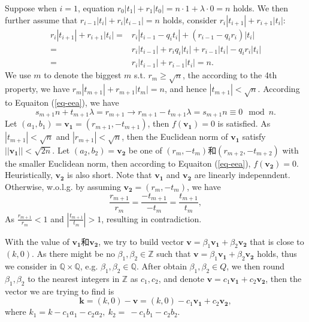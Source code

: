 \documentclass{article}
\newcommand{\Z}{\mathbb{Z}}
\newcommand{\Q}{\mathbb{Q}}
\begin{document}
Suppose when $i = 1$, equation $r_0|t_1| + r_1|t_0| = n \cdot 1 + \lambda \cdot 0 = n$ holds.
We then further assume that $r_{i-1}|t_i| + r_i|t_{i-1}| = n$ holds, consider $r_{i}|t_{i+1}| + r_{i+1}|t_{i}|$:
\begin{equation}\nonumber
\begin{split}
r_{i}|t_{i+1}| + r_{i+1}|t_{i}| = & r_{i}|t_{i-1} - q_{i}t_{i}| + (r_{i-1}-q_{i}r_{i})|t_{i}| \\
= & r_i|t_{i-1}| + r_iq_i|t_i| + r_{i-1}|t_i| - q_ir_i|t_i|\\
= & r_i|t_{i-1}|+ r_{i-1}|t_i| = n.
\end{split}
\end{equation}
We use $m$ to denote the biggest $m$ s.t. $r_m \ge \sqrt{n}$,
the according to the 4th property, we have $r_m|t_{m+1}| + r_{m+1}|t_m| = n$, and hence $|t_{m+1}|<\sqrt{n}$.
According to Equaiton (\ref{eq-eea}), we have
$$s_{m+1}n + t_{m+1}\lambda = r_{m+1} \rightarrow r_{m+1} - t_{m+1} \lambda = s_{m+1} n \equiv 0 \mod n.$$
Let $(a_1, b_1) = \mathbf{v_1}  = (r_{m+1}, - t_{m+1})$, then $f(\mathbf{v_1}) = 0$ is satisfied.
As $|t_{m+1}|<\sqrt{n}$ and $|r_{m+1}| < \sqrt{n}$,  then the Euclidean norm of $\mathbf{v_1}$ satisfy $||\mathbf{v_1}|| <\sqrt{2n}$.
Let $(a_2, b_2) = \mathbf{v_2}$ be one of $(r_{m}, - t_{m})$和$(r_{m+2}, - t_{m+2})$ with the smaller Euclidean norm,
then according to Equaiton (\ref{eq-eea}), $f(\mathbf{v_2}) = 0$.
Heuristically, $\mathbf{v_2}$ is also short.
Note that $\mathbf{v_1}$ and $\mathbf{v_2}$ are linearly indepenndent. 
Otherwise, w.o.l.g.  by assuming $\mathbf{v_2}=(r_m,-t_m)$, we have
$$
\dfrac{r_{m+1}}{r_m} = \dfrac{-t_{m+1}}{-t_m} = \dfrac{t_{m+1}}{t_m},
$$
As $\frac{r_{m+1}}{r_m} < 1$ and $|\frac{t_{m+1}}{t_m}| > 1$, resulting in contradiction.

With the value of $\mathbf{v_1}$和$\mathbf{v_2}$, we try to build vector 
$\mathbf{v} = \beta_1\mathbf{v_1} + \beta_2\mathbf{v_2}$ that is close to $(k,0)$.
As there might be no $\beta_1, \beta_2 \in \Z$ such that $\mathbf{v} = \beta_1\mathbf{v_1} + \beta_2\mathbf{v_2}$ holds,
thus we consider in $\Q\times\Q$, e.g. $\beta_1, \beta_2 \in \Q$.
After obtain $\beta_1, \beta_2 \in Q$, we then round $\beta_1, \beta_2$ to the nearest integers in $\Z$ as $c_1, c_2$,
and denote $\mathbf{v} = c_1\mathbf{v_1} + c_2\mathbf{v_2}$, then the vector we are trying to find is 
$$\mathbf{k} = (k,0) - \mathbf{v} = (k, 0) - c_1\mathbf{v_1} + c_2\mathbf{v_2},$$
where $k_1 =  k - c_1a_1 - c_2a_2, \ k_2 = \ -c_1b_1-c_2b_2$.
\end{document}

